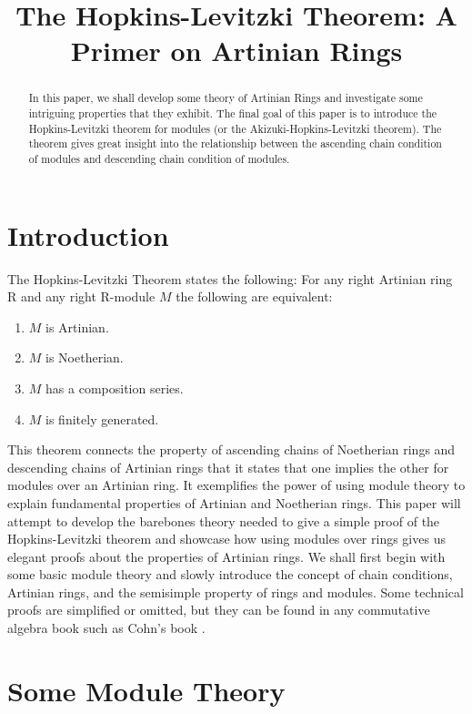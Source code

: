 \documentclass[11pt]{article}
\title{The Hopkins-Levitzki Theorem: A Primer on Artinian Rings}
\author{\Name}
\begin{document}
\maketitle

\begin{abstract}
 In this paper, we shall develop some theory of Artinian Rings and investigate some intriguing properties that they exhibit. The final 
 goal of this paper is to introduce the Hopkins-Levitzki theorem for modules (or the Akizuki-Hopkins-Levitzki theorem). The theorem gives great insight into
 the relationship between the ascending chain condition of modules and descending chain condition of modules.
\end{abstract}


\section{Introduction}
The Hopkins-Levitzki Theorem states the following: \newline \newline
For any right Artinian ring R and any right R-module $M$ the following are equivalent:

\begin{enumerate}
 \item $M$ is Artinian.
 \item $M$ is Noetherian.
 \item $M$ has a composition series.
 \item $M$ is finitely generated.
\end{enumerate}

This theorem connects the property of ascending chains of Noetherian rings and descending chains of Artinian rings that it states that one implies the other for modules over an Artinian ring. It exemplifies the power of using module theory to explain fundamental properties of Artinian and Noetherian
rings. This paper will attempt to develop the barebones theory needed to give a simple proof of the Hopkins-Levitzki theorem and showcase how using modules over rings gives us elegant proofs about the properties of Artinian rings. We shall first
begin with some basic module theory and slowly introduce the concept of chain conditions, Artinian rings, and the semisimple property of rings and modules. Some technical proofs are simplified or omitted, but they can be found in any commutative algebra book such as Cohn's book \cite{cohn04}.   


\section{Some Module Theory}
\end{document}
